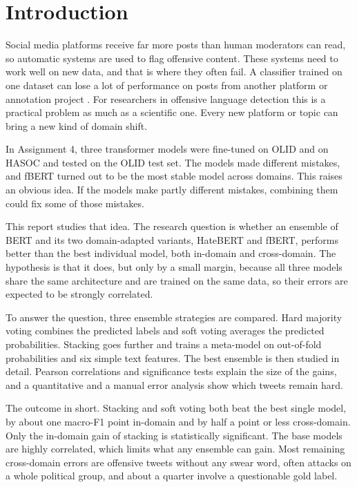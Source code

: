 \documentclass[11pt,a4paper]{article}
\begin{document}
\section{Introduction}

Social media platforms receive far more posts than human moderators can read, so automatic systems are used to flag offensive content. These systems need to work well on new data, and that is where they often fail. A classifier trained on one dataset can lose a lot of performance on posts from another platform or annotation project \citep{fortuna2021how}. For researchers in offensive language detection this is a practical problem as much as a scientific one. Every new platform or topic can bring a new kind of domain shift.

In Assignment 4, three transformer models were fine-tuned on OLID and on HASOC and tested on the OLID test set. The models made different mistakes, and fBERT turned out to be the most stable model across domains. This raises an obvious idea. If the models make partly different mistakes, combining them could fix some of those mistakes.

This report studies that idea. The research question is whether an ensemble of BERT and its two domain-adapted variants, HateBERT and fBERT, performs better than the best individual model, both in-domain and cross-domain. The hypothesis is that it does, but only by a small margin, because all three models share the same architecture and are trained on the same data, so their errors are expected to be strongly correlated.

To answer the question, three ensemble strategies are compared. Hard majority voting combines the predicted labels and soft voting averages the predicted probabilities. Stacking goes further and trains a meta-model on out-of-fold probabilities and six simple text features. The best ensemble is then studied in detail. Pearson correlations and significance tests explain the size of the gains, and a quantitative and a manual error analysis show which tweets remain hard.

The outcome in short. Stacking and soft voting both beat the best single model, by about one macro-F1 point in-domain and by half a point or less cross-domain. Only the in-domain gain of stacking is statistically significant. The base models are highly correlated, which limits what any ensemble can gain. Most remaining cross-domain errors are offensive tweets without any swear word, often attacks on a whole political group, and about a quarter involve a questionable gold label.
\end{document}
